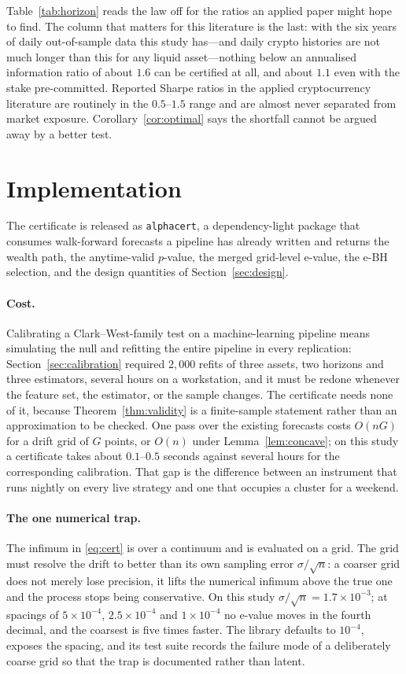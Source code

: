 \documentclass{article}
\theoremstyle{plain}
\theoremstyle{definition}
\begin{document}
Table~\ref{tab:horizon} reads the law off for the ratios an applied paper might hope to
find. The column that matters for this literature is the last: with the six years of daily
out-of-sample data this study has---and daily crypto histories are not much longer than
this for any liquid asset---nothing below an annualised information ratio of about $1.6$ can
be certified at all, and about $1.1$ even with the stake pre-committed. Reported Sharpe
ratios in the applied cryptocurrency literature are routinely in the $0.5$--$1.5$ range and
are almost never separated from market exposure. Corollary~\ref{cor:optimal} says the
shortfall cannot be argued away by a better test.

\section{Implementation}
\label{sec:implementation}

The certificate is released as \texttt{alphacert}, a dependency-light package that consumes
walk-forward forecasts a pipeline has already written and returns the wealth path, the
anytime-valid $p$-value, the merged grid-level e-value, the e-BH selection, and the design
quantities of Section~\ref{sec:design}.

\paragraph{Cost.} Calibrating a Clark--West-family test on a machine-learning pipeline means
simulating the null and refitting the entire pipeline in every replication:
Section~\ref{sec:calibration} required $2{,}000$ refits of three assets, two horizons and
three estimators, several hours on a workstation, and it must be redone whenever the feature
set, the estimator, or the sample changes. The certificate needs none of it, because
Theorem~\ref{thm:validity} is a finite-sample statement rather than an approximation to be
checked. One pass over the existing forecasts costs $O(nG)$ for a drift grid of $G$ points,
or $O(n)$ under Lemma~\ref{lem:concave}; on this study a certificate takes about
$0.1$--$0.5$ seconds against several hours for the corresponding calibration. That gap is
the difference between an instrument that runs nightly on every live strategy and one that
occupies a cluster for a weekend.

\paragraph{The one numerical trap.} The infimum in \eqref{eq:cert} is over a continuum and is
evaluated on a grid. The grid must resolve the drift to better than its own sampling error
$\sigma/\sqrt{n}$: a coarser grid does not merely lose precision, it lifts the numerical
infimum above the true one and the process stops being conservative. On this study
$\sigma/\sqrt{n}=1.7\times10^{-3}$; at spacings of $5\times10^{-4}$, $2.5\times10^{-4}$ and
$1\times10^{-4}$ no e-value moves in the fourth decimal, and the coarsest is five times
faster. The library defaults to $10^{-4}$, exposes the spacing, and its test suite records
the failure mode of a deliberately coarse grid so that the trap is documented rather than
latent.
\end{document}
